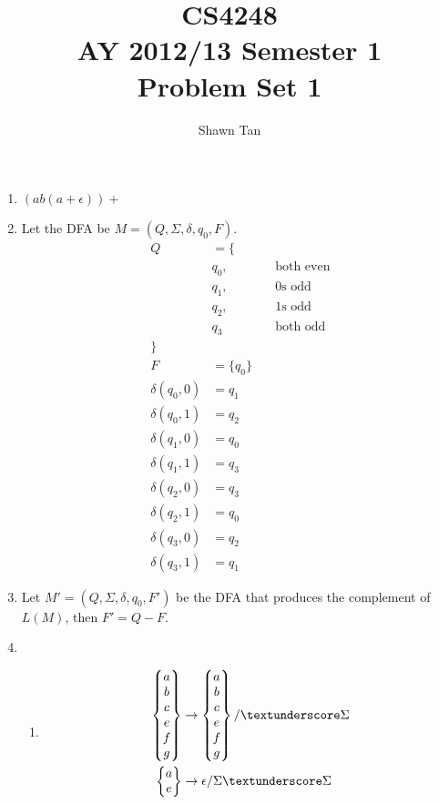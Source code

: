 \documentclass[12 pt]{article}
\title{CS4248 \\ AY 2012/13 Semester 1\\ Problem Set 1}
\author{Shawn Tan}
\begin{document}
\maketitle

\begin{enumerate}
	\item $(ab(a+\epsilon))+$
	\item Let the DFA be $M = (Q,\Sigma,\delta,q_0,F)$.
\begin{align*}
	Q &= \{\\
			&q_0, &\quad\text{both even}\\
			&q_1, &\quad\text{0s odd}\\
			&q_2, &\quad\text{1s odd}\\
			&q_3  &\quad\text{both odd}\\
		\} \\
	F &= \{q_0\} \\
	\delta(q_0,0) &= q_1 \\
	\delta(q_0,1) &= q_2 \\
	\delta(q_1,0) &= q_0 \\
	\delta(q_1,1) &= q_3 \\
	\delta(q_2,0) &= q_3 \\
	\delta(q_2,1) &= q_0 \\
	\delta(q_3,0) &= q_2 \\
	\delta(q_3,1) &= q_1
\end{align*}

\item Let $M' = (Q,\Sigma,\delta,q_0,F')$ be the DFA that produces the complement of $L(M)$, then $F' = Q - F$.


\item
	\begin{enumerate}
		\item
		\begin{align*}
			\left\{ \begin{matrix} a \\ b \\ c \\ e \\ f \\ g \end{matrix}\right\}
				&\rightarrow 
			\left\{ \begin{matrix} a \\ b \\ c \\ e \\ f \\ g \end{matrix}\right\}
				/ \_ \Sigma
			\\
			\left\{ \begin{matrix} a \\ e \end{matrix}\right\}
				&\rightarrow \epsilon / \Sigma \textunderscore \Sigma \\
		\end{align*}
		

\end{enumerate}
\end{enumerate}
\end{document}
